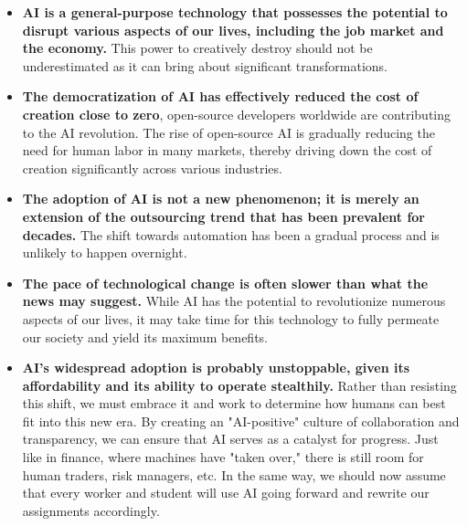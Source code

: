 \begin{itemize}
\item \textbf{AI is a general-purpose technology that possesses the potential to disrupt various aspects of our lives, including the job market and the economy.} This power to creatively destroy should not be underestimated as it can bring about significant transformations.
\item \textbf{The democratization of AI has effectively reduced the cost of creation close to zero}, open-source developers worldwide are contributing to the AI revolution. The rise of open-source AI is gradually reducing the need for human labor in many markets, thereby driving down the cost of creation significantly across various industries.
\item \textbf{The adoption of AI is not a new phenomenon; it is merely an extension of the outsourcing trend that has been prevalent for decades.} The shift towards automation has been a gradual process and is unlikely to happen overnight.
\item \textbf{The pace of technological change is often slower than what the news may suggest.} While AI has the potential to revolutionize numerous aspects of our lives, it may take time for this technology to fully permeate our society and yield its maximum benefits.
\item \textbf{AI's widespread adoption is probably unstoppable, given its affordability and its ability to operate stealthily.} Rather than resisting this shift, we must embrace it and work to determine how humans can best fit into this new era. By creating an "AI-positive" culture of collaboration and transparency, we can ensure that AI serves as a catalyst for progress. Just like in finance, where machines have "taken over," there is still room for human traders, risk managers, etc. In the same way, we should now assume that every worker and student will use AI going forward and rewrite our assignments accordingly.
\end{itemize}
